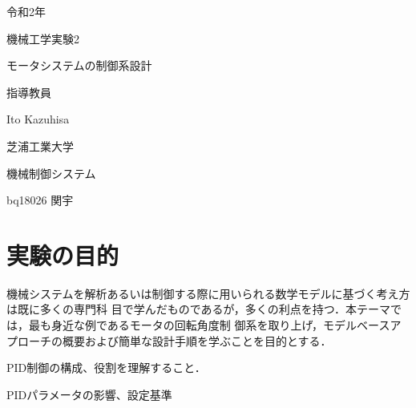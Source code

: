 \documentclass[xelatex,ja=standard,jafont=noto]{bxjsarticle}
\date{11.4 2020}
\numberwithin{figure}{section}
\begin{document}
\renewcommand{\figurename}{Fig.}
\renewcommand{\tablename}{Table }



	\begin{titlepage}
			\begin{center}
				
				{\Large 令和2年}
				
				\vspace{10truept}
				
				{\Large 機械工学実験2}
				
				\vspace*{140truept}
				
				{\Huge モータシステムの制御系設計} 
				
				\vspace{160truept}
				
				{\Large 指導教員}
				
				\vspace{10truept}
				
				{\Large  Ito Kazuhisa }
				
				\vspace{70truept}
				{\Large 芝浦工業大学}
				
				\vspace{10truept}
				
				{\Large 機械制御システム}
				
				\vspace{30truept}
				
				{\Large bq18026 関宇}      
				
			\end{center}
		\end{titlepage}
%


\tableofcontents

\newpage



\section{実験の目的}

機械システムを解析あるいは制御する際に用いられる数学モデルに基づく考え方は既に多くの専門科
目で学んだものであるが，多くの利点を持つ．本テーマでは，最も身近な例であるモータの回転角度制
御系を取り上げ，モデルベースアプローチの概要および簡単な設計手順を学ぶことを目的とする．


PID制御の構成、役割を理解すること．

PIDパラメータの影響、設定基準
\end{document}
